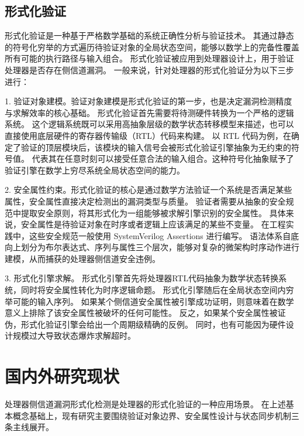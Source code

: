 \subsection{形式化验证}
形式化验证是一种基于严格数学基础的系统正确性分析与验证技术。
其通过静态的符号化穷举的方式遍历待验证对象的全局状态空间，能够以数学上的完备性覆盖所有可能的执行路径与输入组合。
形式化验证被应用到处理器设计上，用于验证处理器是否存在侧信道漏洞\cite{10.1145/3658644.3690344}\cite{10.1145/3613424.3614254}。
一般来说，针对处理器的形式化验证分为以下三步进行：

1. 验证对象建模。验证对象建模是形式化验证的第一步，也是决定漏洞检测精度与求解效率的核心基础。
形式化验证首先需要将待测硬件转换为一个严格的逻辑系统。
这个逻辑系统既可以采用高抽象层级的数学状态转移模型来描述，也可以直接使用底层硬件的寄存器传输级（RTL）代码来构建。
以 RTL 代码为例，在确定了验证的顶层模块后，该模块的输入信号会被形式化验证引擎抽象为无约束的符号值。
代表其在任意时刻可以接受任意合法的输入组合。这种符号化抽象赋予了验证引擎在数学上穷尽系统全局状态空间的能力。

2. 安全属性约束。形式化验证的核心是通过数学方法验证一个系统是否满足某些属性，安全属性直接决定检测出的漏洞类型与质量。
验证者需要从抽象的安全规范中提取安全原则，将其形式化为一组能够被求解引擎识别的安全属性。
具体来说，安全属性是待验证对象在时序或者逻辑上应该满足的某些不变量。
在工程实践中，这些安全规范一般使用 SystemVerilog Assertions 进行编写。
语法体系自底向上划分为布尔表达式、序列与属性三个层次，能够对复杂的微架构时序动作进行建模，从而捕获的处理器侧信道安全违例。

3. 形式化引擎求解。
形式化引擎首先将处理器RTL代码抽象为数学状态转换系统，同时将安全属性转化为时序逻辑命题。
形式化引擎随后在全局状态空间内穷举可能的输入序列。
如果某个侧信道安全属性被引擎成功证明，则意味着在数学意义上排除了该安全属性被破坏的任何可能性。
反之，如果某个安全属性被证伪，形式化验证引擎会给出一个周期级精确的反例。
同时，也有可能因为硬件设计规模过大导致状态爆炸求解超时。



\section{国内外研究现状}

处理器侧信道漏洞形式化检测是处理器的形式化验证的一种应用场景。
在上述基本概念基础上，现有研究主要围绕验证对象边界、安全属性设计与状态同步机制三条主线展开。

